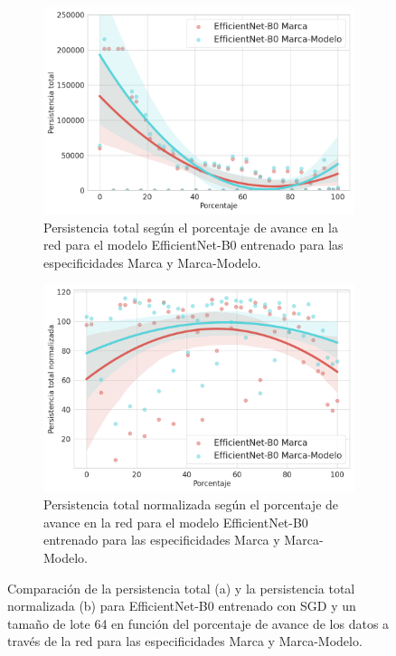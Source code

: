 \begin{figure}[H]
	\centering
	\begin{subfigure}
		{.5\textwidth}
		\centering
		\includegraphics[width=\linewidth]{img/general_efficientnet.png}
		\caption{Persistencia total según el porcentaje de avance en la red para el
			modelo EfficientNet-B0 entrenado para las especificidades Marca y Marca-Modelo.}
		\label{fig:efficientnet-1}
	\end{subfigure}%
	\begin{subfigure}
		{.5\textwidth}
		\centering
		\includegraphics[width=\linewidth]{img/general_efficientnet_norm.png}
		\caption{Persistencia total normalizada según el porcentaje de avance en la
			red para el modelo EfficientNet-B0 entrenado para las especificidades Marca
			y Marca-Modelo.}
		\label{fig:efficientnet-2}
	\end{subfigure}
	\caption{Comparación de la persistencia total (a) y la persistencia total
		normalizada (b) para EfficientNet-B0 entrenado con SGD y un tamaño de lote 64
		en función del porcentaje de avance de los datos a través de la red para las
		especificidades Marca y Marca-Modelo.}
	\label{fig:efficientnet}
\end{figure}

